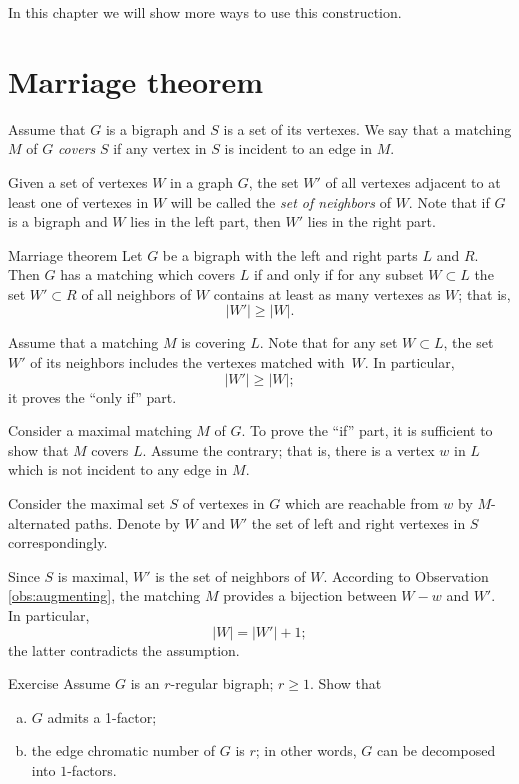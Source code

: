 In this chapter we will show more ways to use this construction.

\section*{Marriage theorem}

Assume that $G$ is a bigraph and $S$ is a set of its vertexes.
We say that a matching $M$ of $G$ {}\emph{covers} $S$ if any vertex in $S$ is incident to an edge in $M$.

Given a set of vertexes $W$ in a graph $G$, the set $W'$ of all vertexes  adjacent to at least one of vertexes in $W$ will be called the \emph{set of neighbors} of $W$.
Note that if $G$ is a bigraph and $W$ lies in the left part, then $W'$ lies in the right part. 

\begin{thm}{Marriage theorem}
Let $G$ be a bigraph with the left and right parts $L$ and $R$.
Then $G$ has a matching which covers $L$ if and only if for any subset $W\subset L$ the set $W'\subset R$ of all neighbors of $W$ contains at least as many vertexes as $W$; that is, 
\[|W'|\ge |W|.\] 

\end{thm}

Assume that a matching $M$ is covering $L$.
Note that for any set  $W\subset L$, the set $W'$ of its neighbors includes the vertexes matched with~$W$.
In particular,
\[|W'|\ge |W|;\]
it proves the ``only if'' part.

Consider a maximal matching $M$ of $G$.
To prove the ``if'' part, it is sufficient to show that $M$ covers $L$.
Assume the contrary; that is, there is a vertex $w$ in $L$ which is not incident to any edge in $M$.

Consider the maximal set $S$ of vertexes in $G$ which are reachable from $w$ by 
$M$-alternated paths.
Denote by $W$ and $W'$ the set of left and right vertexes in $S$ correspondingly.

Since $S$ is maximal, $W'$ is the set of neighbors of $W$. 
According to Observation \ref{obs:augmenting}, the matching $M$ provides a bijection between $W-w$ and $W'$.
In particular, 
\[|W|=|W'|+1;\] 
the latter contradicts the assumption.
\qeds

\begin{thm}{Exercise}
Assume $G$ is an $r$-regular bigraph; $r\ge 1$.
Show that 
\begin{enumerate}[(a)]
\item $G$ admits a 1-factor;
\item the edge chromatic number of $G$ is $r$; in other words, $G$ can be decomposed into $1$-factors.
\end{enumerate}

\end{thm}

